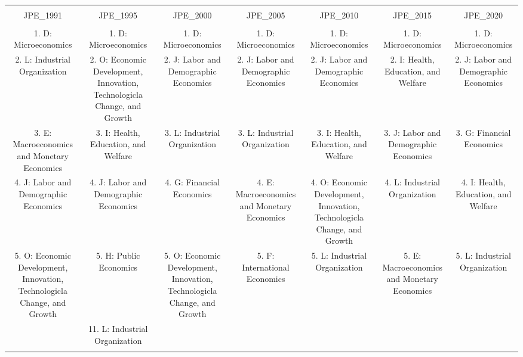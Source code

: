 
\begin{table}[!htbp] \centering 
  \caption{} 
  \label{} 
\begin{tabular}{@{\extracolsep{5pt}} ccccccc} 
\\[-1.8ex]\hline 
\hline \\[-1.8ex] 
JPE\_1991 & JPE\_1995 & JPE\_2000 & JPE\_2005 & JPE\_2010 & JPE\_2015 & JPE\_2020 \\ 
\hline \\[-1.8ex] 
1. D: Microeconomics & 1. D: Microeconomics & 1. D: Microeconomics & 1. D: Microeconomics & 1. D: Microeconomics & 1. D: Microeconomics & 1. D: Microeconomics \\ 
2. L: Industrial Organization & 2. O: Economic Development, Innovation, Technologicla Change, and Growth & 2. J: Labor and Demographic Economics & 2. J: Labor and Demographic Economics & 2. J: Labor and Demographic Economics & 2. I: Health, Education, and Welfare & 2. J: Labor and Demographic Economics \\ 
3. E: Macroeconomics and Monetary Economics & 3. I: Health, Education, and Welfare & 3. L: Industrial Organization & 3. L: Industrial Organization & 3. I: Health, Education, and Welfare & 3. J: Labor and Demographic Economics & 3. G: Financial Economics \\ 
4. J: Labor and Demographic Economics & 4. J: Labor and Demographic Economics & 4. G: Financial Economics & 4. E: Macroeconomics and Monetary Economics & 4. O: Economic Development, Innovation, Technologicla Change, and Growth & 4. L: Industrial Organization & 4. I: Health, Education, and Welfare \\ 
5. O: Economic Development, Innovation, Technologicla Change, and Growth & 5. H: Public Economics & 5. O: Economic Development, Innovation, Technologicla Change, and Growth & 5. F: International Economics & 5. L: Industrial Organization & 5. E: Macroeconomics and Monetary Economics & 5. L: Industrial Organization \\ 
 & 11. L: Industrial Organization &  &  &  &  &  \\ 
\hline \\[-1.8ex] 
\end{tabular} 
\end{table} 
